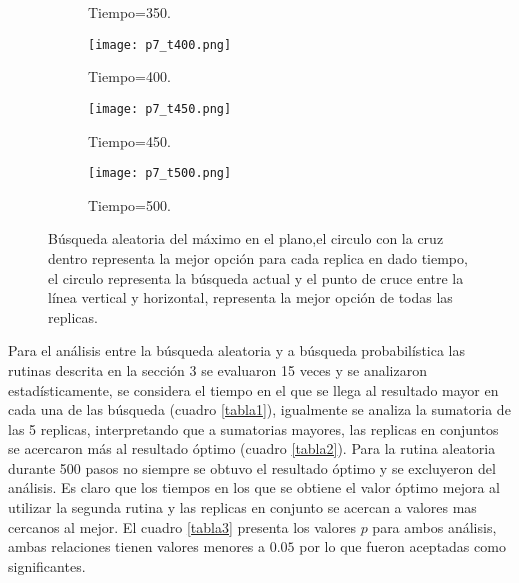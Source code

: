 \documentclass{article}
\begin{document}
\begin{figure}
\begin{subfigure}[]{.25\linewidth}
         \caption{Tiempo=350.}
         \label{8}
    \end{subfigure}
         \begin{subfigure}[]{.25\linewidth}
         \texttt{[image: p7\_t400.png]}
         \caption{Tiempo=400.}
         \label{9}
     \end{subfigure}
     \begin{subfigure}[]{.25\linewidth}
     \centering
         \texttt{[image: p7\_t450.png]}
         \caption{Tiempo=450.}
         \label{}
    \end{subfigure}\hspace{20mm}
    \begin{subfigure}[]{.25\linewidth}
         \centering
         \texttt{[image: p7\_t500.png]}
         \caption{Tiempo=500.}
         \label{10}
     \end{subfigure}
     \caption{Búsqueda aleatoria del máximo en el plano,el circulo con la cruz dentro representa la mejor opción para cada replica en dado tiempo, el circulo representa la búsqueda actual y el punto de cruce entre la línea vertical y horizontal, representa la mejor opción de todas las replicas.}
        \label{F2}
\end{figure}
Para el análisis entre la búsqueda aleatoria y a búsqueda probabilística las rutinas descrita en la sección 3 se evaluaron 15 veces y se analizaron estadísticamente, se considera el tiempo en el que se llega al resultado mayor en cada una de las búsqueda (cuadro \ref{tabla1}), igualmente se analiza la sumatoria de las 5 replicas, interpretando que a sumatorias mayores, las replicas en conjuntos se acercaron más al resultado óptimo (cuadro \ref{tabla2}). Para la rutina aleatoria durante 500 pasos no siempre se obtuvo el resultado óptimo y se excluyeron del análisis. Es claro que los tiempos en los que se obtiene el valor óptimo mejora al utilizar la segunda rutina y las replicas en conjunto se acercan a valores mas cercanos al mejor. El cuadro \ref{tabla3} presenta los valores $p$ para ambos análisis, ambas relaciones tienen valores menores a $0.05$ por lo que fueron aceptadas como significantes. 
\end{document}
